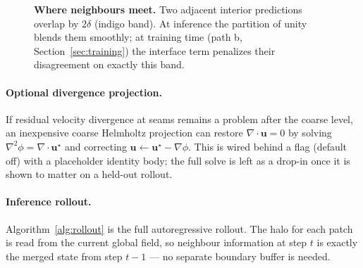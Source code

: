 \documentclass[11pt]{article}
\begin{document}
\begin{figure}[t]
\centering
{}
\caption{\textbf{Where neighbours meet.} Two adjacent interior predictions overlap
by $2\delta$ (indigo band). At inference the partition of unity blends them
smoothly; at training time (path b, Section~\ref{sec:training}) the interface term
penalizes their disagreement on exactly this band.}
\label{fig:interface}
\end{figure}

\paragraph{Optional divergence projection.}
If residual velocity divergence at seams remains a problem after the coarse level,
an inexpensive coarse Helmholtz projection can restore $\nabla\!\cdot\!\bm u=0$ by
solving $\nabla^2\phi=\nabla\!\cdot\!\bm u^\star$ and correcting $\bm u\leftarrow\bm
u^\star-\nabla\phi$. This is wired behind a flag (default off) with a placeholder
identity body; the full solve is left as a drop-in once it is shown to matter on a
held-out rollout.

\paragraph{Inference rollout.}
Algorithm~\ref{alg:rollout} is the full autoregressive rollout. The halo for each
patch is read from the current global field, so neighbour information at step $t$ is
exactly the merged state from step $t-1$ --- no separate boundary buffer is needed.
\end{document}
